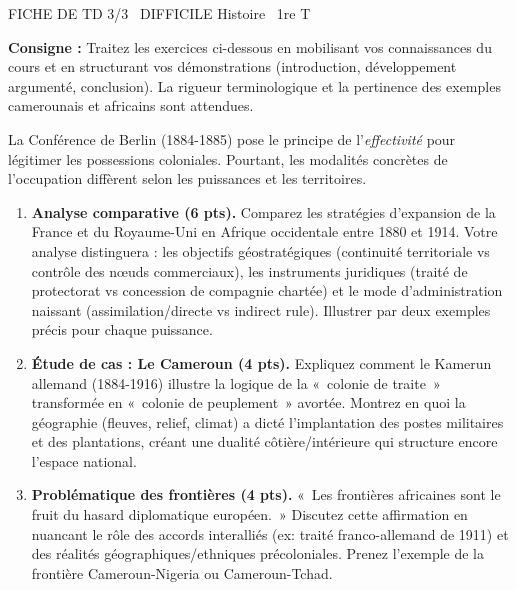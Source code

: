 \documentclass[11pt]{article}
\begin{document}
\begin{tcolorbox}[enhanced,colback=popink,colframe=popink,arc=10pt,boxrule=0pt,left=12pt,right=12pt,top=9pt,bottom=9pt]
{\color{white}\popxbold\small FICHE DE TD 3/3 \textbullet\ DIFFICILE \hfill Histoire \textbullet\ 1re T\par}
\end{tcolorbox}
\vspace{4pt}
\noindent \textbf{Consigne :} Traitez les exercices ci-dessous en mobilisant vos connaissances du cours et en structurant vos démonstrations (introduction, développement argumenté, conclusion). La rigueur terminologique et la pertinence des exemples camerounais et africains sont attendues.

\begin{exercice}
\noindent La Conférence de Berlin (1884-1885) pose le principe de l'\textit{effectivité} pour légitimer les possessions coloniales. Pourtant, les modalités concrètes de l'occupation diffèrent selon les puissances et les territoires.

\begin{enumerate}
    \item \textbf{Analyse comparative (6 pts).} Comparez les stratégies d'expansion de la France et du Royaume-Uni en Afrique occidentale entre 1880 et 1914. Votre analyse distinguera : les objectifs géostratégiques (continuité territoriale vs contrôle des nœuds commerciaux), les instruments juridiques (traité de protectorat vs concession de compagnie chartée) et le mode d'administration naissant (assimilation/directe vs indirect rule). Illustrer par deux exemples précis pour chaque puissance.
    \item \textbf{Étude de cas : Le Cameroun (4 pts).} Expliquez comment le Kamerun allemand (1884-1916) illustre la logique de la «~colonie de traite~» transformée en «~colonie de peuplement~» avortée. Montrez en quoi la géographie (fleuves, relief, climat) a dicté l'implantation des postes militaires et des plantations, créant une dualité côtière/intérieure qui structure encore l'espace national.
    \item \textbf{Problématique des frontières (4 pts).} «~Les frontières africaines sont le fruit du hasard diplomatique européen.~» Discutez cette affirmation en nuancant le rôle des accords interalliés (ex: traité franco-allemand de 1911) et des réalités géographiques/ethniques précoloniales. Prenez l'exemple de la frontière Cameroun-Nigeria ou Cameroun-Tchad.
\end{enumerate}
\end{exercice}
\end{document}
